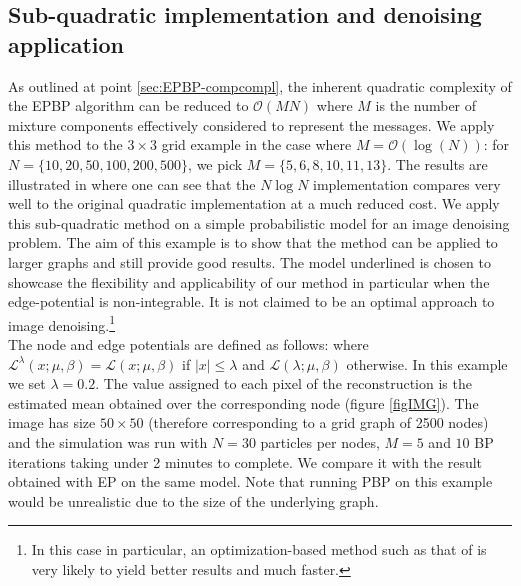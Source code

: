 \subsection{Sub-quadratic implementation and denoising application}
As outlined at point \ref{sec:EPBP-compcompl}, the inherent quadratic complexity of the EPBP algorithm can be reduced to $\mathcal O(MN)$ where $M$ is the number of mixture components effectively considered to represent the messages. 
We apply this method to the $3\times 3$ grid example in the case where $M=\mathcal O(\log(N))$: for $N=\{10,20,50,100,200,500\}$, we pick $M=\{5, 6,8,10,11,13\}$. The results are illustrated in  where one can see that the $N\log N$ implementation compares very well to the original quadratic implementation at a much reduced cost. We apply this sub-quadratic method on a simple probabilistic model for an image denoising problem. The aim of this example is to show that the method can be applied to larger graphs and still provide good results. The model underlined is chosen to showcase the flexibility and applicability of our method in particular when the edge-potential is non-integrable. It is not claimed to be an optimal approach to image denoising.\footnote{In this case in particular, an optimization-based method such as that of \citet{rudin92} is very likely to yield better results and much faster.} \\
The node and edge potentials are defined as follows:
where $\mathcal L^{\lambda}(x;\mu,\beta)=\mathcal L(x;\mu,\beta)$ if $|x|\le \lambda$ and $\mathcal L(\lambda;\mu,\beta)$ otherwise. In this example we set $\lambda=0.2$. The value assigned to each pixel of the reconstruction is the estimated mean obtained over the corresponding node (figure \ref{figIMG}). The image has size $50\times 50$ (therefore corresponding to a grid graph of 2500 nodes) and the simulation was run with $N=30$ particles per nodes, $M=5$ and $10$ BP iterations taking under 2 minutes to complete. We compare it with the result obtained with EP on the same model. Note that running PBP on this example would be unrealistic due to the size of the underlying graph.



